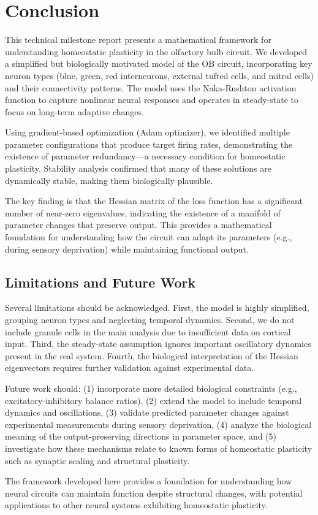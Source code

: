 \documentclass[12pt]{article}
\begin{document}
\section{Conclusion}

This technical milestone report presents a mathematical framework for understanding homeostatic plasticity in the olfactory bulb circuit. We developed a simplified but biologically motivated model of the OB circuit, incorporating key neuron types (blue, green, red interneurons, external tufted cells, and mitral cells) and their connectivity patterns. The model uses the Naka-Rushton activation function to capture nonlinear neural responses and operates in steady-state to focus on long-term adaptive changes.

Using gradient-based optimization (Adam optimizer), we identified multiple parameter configurations that produce target firing rates, demonstrating the existence of parameter redundancy—a necessary condition for homeostatic plasticity. Stability analysis confirmed that many of these solutions are dynamically stable, making them biologically plausible.

The key finding is that the Hessian matrix of the loss function has a significant number of near-zero eigenvalues, indicating the existence of a manifold of parameter changes that preserve output. This provides a mathematical foundation for understanding how the circuit can adapt its parameters (e.g., during sensory deprivation) while maintaining functional output.

\subsection{Limitations and Future Work}

Several limitations should be acknowledged. First, the model is highly simplified, grouping neuron types and neglecting temporal dynamics. Second, we do not include granule cells in the main analysis due to insufficient data on cortical input. Third, the steady-state assumption ignores important oscillatory dynamics present in the real system. Fourth, the biological interpretation of the Hessian eigenvectors requires further validation against experimental data.

Future work should: (1) incorporate more detailed biological constraints (e.g., excitatory-inhibitory balance ratios), (2) extend the model to include temporal dynamics and oscillations, (3) validate predicted parameter changes against experimental measurements during sensory deprivation, (4) analyze the biological meaning of the output-preserving directions in parameter space, and (5) investigate how these mechanisms relate to known forms of homeostatic plasticity such as synaptic scaling and structural plasticity.

The framework developed here provides a foundation for understanding how neural circuits can maintain function despite structural changes, with potential applications to other neural systems exhibiting homeostatic plasticity.

\appendices
\end{document}
